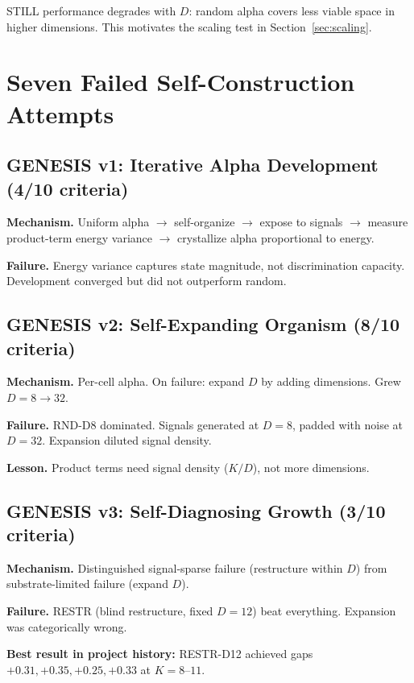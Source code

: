 \documentclass[11pt,a4paper]{article}
\begin{document}
STILL performance degrades with $D$: random alpha covers less viable space in higher dimensions. This motivates the scaling test in Section~\ref{sec:scaling}.

\section{Seven Failed Self-Construction Attempts}
\label{sec:failures}

\subsection{GENESIS v1: Iterative Alpha Development (4/10 criteria)}

\textbf{Mechanism.} Uniform alpha $\to$ self-organize $\to$ expose to signals $\to$ measure product-term energy variance $\to$ crystallize alpha proportional to energy.

\textbf{Failure.} Energy variance captures state magnitude, not discrimination capacity. Development converged but did not outperform random.

\subsection{GENESIS v2: Self-Expanding Organism (8/10 criteria)}

\textbf{Mechanism.} Per-cell alpha. On failure: expand $D$ by adding dimensions. Grew $D{=}8 \to 32$.

\textbf{Failure.} RND-D8 dominated. Signals generated at $D{=}8$, padded with noise at $D{=}32$. Expansion diluted signal density.

\textbf{Lesson.} Product terms need signal density ($K/D$), not more dimensions.

\subsection{GENESIS v3: Self-Diagnosing Growth (3/10 criteria)}

\textbf{Mechanism.} Distinguished signal-sparse failure (restructure within $D$) from substrate-limited failure (expand $D$).

\textbf{Failure.} RESTR (blind restructure, fixed $D{=}12$) beat everything. Expansion was categorically wrong.

\textbf{Best result in project history:} RESTR-D12 achieved gaps $+0.31, +0.35, +0.25, +0.33$ at $K{=}8$--$11$.
\end{document}
